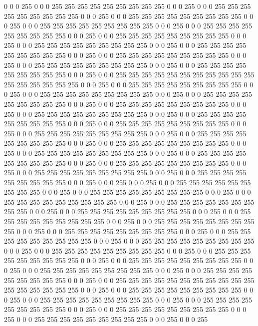 0 0 0 255 0 0 0 255 255 255 255 255 255 255 255 255 0 0 0 255 0 0 0 255 255 255 255 255 255 255 255 255
0 0 0 255 0 0 0 255 255 255 255 255 255 255 255 255 0 0 0 255 0 0 0 255 255 255 255 255 255 255 255 255
0 0 0 255 0 0 0 255 255 255 255 255 255 255 255 255 0 0 0 255 0 0 0 255 255 255 255 255 255 255 255 255
0 0 0 255 0 0 0 255 255 255 255 255 255 255 255 255 0 0 0 255 0 0 0 255 255 255 255 255 255 255 255 255
0 0 0 255 0 0 0 255 255 255 255 255 255 255 255 255 0 0 0 255 0 0 0 255 255 255 255 255 255 255 255 255
0 0 0 255 0 0 0 255 255 255 255 255 255 255 255 255 0 0 0 255 0 0 0 255 255 255 255 255 255 255 255 255
255 255 255 255 255 255 255 255 0 0 0 255 0 0 0 255 255 255 255 255 255 255 255 255 0 0 0 255 0 0 0 255
255 255 255 255 255 255 255 255 0 0 0 255 0 0 0 255 255 255 255 255 255 255 255 255 0 0 0 255 0 0 0 255
255 255 255 255 255 255 255 255 0 0 0 255 0 0 0 255 255 255 255 255 255 255 255 255 0 0 0 255 0 0 0 255
255 255 255 255 255 255 255 255 0 0 0 255 0 0 0 255 255 255 255 255 255 255 255 255 0 0 0 255 0 0 0 255
255 255 255 255 255 255 255 255 0 0 0 255 0 0 0 255 255 255 255 255 255 255 255 255 0 0 0 255 0 0 0 255
255 255 255 255 255 255 255 255 0 0 0 255 0 0 0 255 255 255 255 255 255 255 255 255 0 0 0 255 0 0 0 255
255 255 255 255 255 255 255 255 0 0 0 255 0 0 0 255 255 255 255 255 255 255 255 255 0 0 0 255 0 0 0 255
255 255 255 255 255 255 255 255 0 0 0 255 0 0 0 255 255 255 255 255 255 255 255 255 0 0 0 255 0 0 0 255
0 0 0 255 0 0 0 255 255 255 255 255 255 255 255 255 0 0 0 255 0 0 0 255 255 255 255 255 255 255 255 255
0 0 0 255 0 0 0 255 255 255 255 255 255 255 255 255 0 0 0 255 0 0 0 255 255 255 255 255 255 255 255 255
0 0 0 255 0 0 0 255 255 255 255 255 255 255 255 255 0 0 0 255 0 0 0 255 255 255 255 255 255 255 255 255
0 0 0 255 0 0 0 255 255 255 255 255 255 255 255 255 0 0 0 255 0 0 0 255 255 255 255 255 255 255 255 255
0 0 0 255 0 0 0 255 255 255 255 255 255 255 255 255 0 0 0 255 0 0 0 255 255 255 255 255 255 255 255 255
0 0 0 255 0 0 0 255 255 255 255 255 255 255 255 255 0 0 0 255 0 0 0 255 255 255 255 255 255 255 255 255
0 0 0 255 0 0 0 255 255 255 255 255 255 255 255 255 0 0 0 255 0 0 0 255 255 255 255 255 255 255 255 255
0 0 0 255 0 0 0 255 255 255 255 255 255 255 255 255 0 0 0 255 0 0 0 255 255 255 255 255 255 255 255 255
255 255 255 255 255 255 255 255 0 0 0 255 0 0 0 255 255 255 255 255 255 255 255 255 0 0 0 255 0 0 0 255
255 255 255 255 255 255 255 255 0 0 0 255 0 0 0 255 255 255 255 255 255 255 255 255 0 0 0 255 0 0 0 255
255 255 255 255 255 255 255 255 0 0 0 255 0 0 0 255 255 255 255 255 255 255 255 255 0 0 0 255 0 0 0 255
